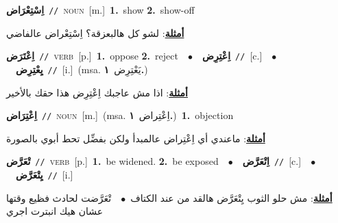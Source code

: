 \documentclass[10pt,a4paper,twoside]{article} %
\begin{document}
\begin{multicols}{2}
{\setlength\topsep{0pt}\textbf{\foreignlanguage{arabic}{اِسْتِعْرَاض}}\ {\color{gray}\texttt{//}\color{black}}\ \textsc{noun}\ [m.]\ \textbf{1.}~show  \textbf{2.}~show-off\  \begin{flushright}\color{gray}\foreignlanguage{arabic}{\textbf{\underline{\foreignlanguage{arabic}{أمثلة}}}: لشو كل هالبعزقة؟ اِسْتِعْراض عالفاضي}\end{flushright}\color{black}} \vspace{2mm}

{\setlength\topsep{0pt}\textbf{\foreignlanguage{arabic}{اِعْتَرَض}}\ {\color{gray}\texttt{//}\color{black}}\ \textsc{verb}\ [p.]\ \textbf{1.}~oppose  \textbf{2.}~reject\ \ $\bullet$\ \ \setlength\topsep{0pt}\textbf{\foreignlanguage{arabic}{اِعْتِرِض}}\ {\color{gray}\texttt{//}\color{black}}\ [c.]\ \ $\bullet$\ \ \setlength\topsep{0pt}\textbf{\foreignlanguage{arabic}{يِعْتِرِض}}\ {\color{gray}\texttt{//}\color{black}}\ [i.]\ \color{gray}(msa. \foreignlanguage{arabic}{يَعْتِرِض}~\foreignlanguage{arabic}{\textbf{١.}})\color{black}\  \begin{flushright}\color{gray}\foreignlanguage{arabic}{\textbf{\underline{\foreignlanguage{arabic}{أمثلة}}}: اذا مش عاجبك اِعْتِرِض هذا حقك بالأخير}\end{flushright}\color{black}} \vspace{2mm}

{\setlength\topsep{0pt}\textbf{\foreignlanguage{arabic}{اِعْتِرَاض}}\ {\color{gray}\texttt{//}\color{black}}\ \textsc{noun}\ [m.]\ \color{gray}(msa. \foreignlanguage{arabic}{اِعْتِراض}~\foreignlanguage{arabic}{\textbf{١.}})\color{black}\ \textbf{1.}~objection\  \begin{flushright}\color{gray}\foreignlanguage{arabic}{\textbf{\underline{\foreignlanguage{arabic}{أمثلة}}}: ماعندي أي اِعْتِراض عالمبدأ ولكن بفضِّل تحط أبوي بالصورة}\end{flushright}\color{black}} \vspace{2mm}

{\setlength\topsep{0pt}\textbf{\foreignlanguage{arabic}{تْعَرَّض}}\ {\color{gray}\texttt{//}\color{black}}\ \textsc{verb}\ [p.]\ \textbf{1.}~be widened.  \textbf{2.}~be exposed\ \ $\bullet$\ \ \setlength\topsep{0pt}\textbf{\foreignlanguage{arabic}{اِتْعَرَّض}}\ {\color{gray}\texttt{//}\color{black}}\ [c.]\ \ $\bullet$\ \ \setlength\topsep{0pt}\textbf{\foreignlanguage{arabic}{يِتْعَرَّض}}\ {\color{gray}\texttt{//}\color{black}}\ [i.]\  \begin{flushright}\color{gray}\foreignlanguage{arabic}{\textbf{\underline{\foreignlanguage{arabic}{أمثلة}}}: مش حلو الثوب يِتْعَرَّض هالقد من عند الكتاف\ $\bullet$\ \  تْعَرَّضت لحادث فظيع وقتها عشان هيك انبترت اجري}\end{flushright}\color{black}} \vspace{2mm}


\end{multicols}
\end{document}
